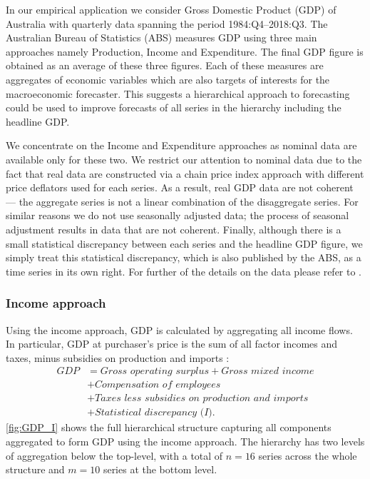 \documentclass[a4paper, 11pt]{article}
\begin{document}
In our empirical application we consider Gross Domestic Product (GDP) of Australia with quarterly data spanning the period 1984:Q4--2018:Q3. The Australian Bureau of Statistics (ABS) measures GDP using three main approaches namely Production, Income and Expenditure. The final GDP figure is obtained as an average of these three figures. Each of these measures are aggregates of economic variables which are also targets of interests for the macroeconomic forecaster. This suggests a hierarchical approach to forecasting could be used to improve forecasts of all series in the hierarchy including the headline GDP.

We concentrate on the Income and Expenditure approaches as nominal data are available only for these two. We restrict our attention to nominal data due to the fact that real data are constructed via a chain price index approach with different price deflators used for each series. As a result, real GDP data are not coherent --- the aggregate series is not a linear combination of the disaggregate series. For similar reasons we do not use seasonally adjusted data; the process of seasonal adjustment results in data that are not coherent. Finally, although there is a small statistical discrepancy between each series and the headline GDP figure, we simply treat this statistical discrepancy, which is also published by the ABS, as a time series in its own right. For further of the details on the data please refer to \citet{ABS2018}.


\subsubsection*{Income approach}

Using the income approach, GDP is calculated by aggregating all income flows. In particular, GDP at purchaser's price is the sum of all factor incomes and taxes, minus subsidies on production and imports \citep{ABS2015}:
\begin{align*}
\textit{GDP}
& = \textit{Gross operating surplus} + \textit{Gross mixed income} \\
& + \textit{Compensation of employees} \\
& + \textit{Taxes less subsidies on production and imports} \\
& + \textit{Statistical discrepancy (I)}.
\end{align*}
\autoref{fig:GDP_I} shows the full hierarchical structure capturing all components aggregated to form GDP using the income approach. The hierarchy has two levels of aggregation below the top-level, with a total of $n=16$ series across the whole structure and $m=10$ series at the bottom level.
\end{document}
